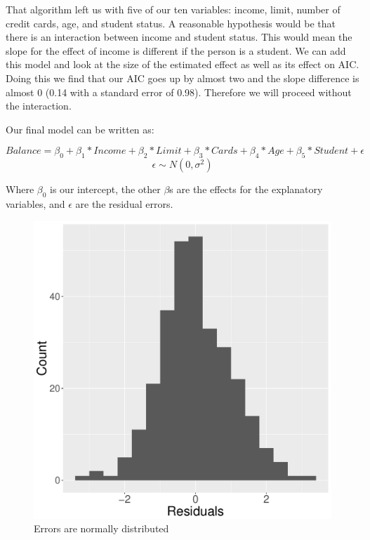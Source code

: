 \documentclass{article}
\begin{document}
That algorithm left us with five of our ten variables: income, limit, number of credit cards, age, and student status. A reasonable hypothesis would be that there is an interaction between income and student status. This would mean the slope for the effect of income is different if the person is a student. We can add this model and look at the size of the estimated effect as well as its effect on AIC. Doing this we find that our AIC goes up by almost two and the slope difference is almost 0 (0.14 with a standard error of 0.98). Therefore we will proceed without the interaction.

Our final model can be written as:

\begin{equation}
Balance = \beta_0+ \beta_1 * Income + \beta_2 * Limit + \beta_3 * Cards + \beta_4 * Age +\beta_5*Student +\epsilon
\end{equation}
$$\epsilon \sim N(0, \sigma^2)
$$          

Where $\beta_0$ is our intercept, the other $\beta$s are the effects for the explanatory variables, and $\epsilon$ are the residual errors.
\begin{figure}
\centering
\includegraphics[scale=.3]{resids.pdf}
\caption{Errors are normally distributed}
\label{resid}
\end{figure}
\end{document}
